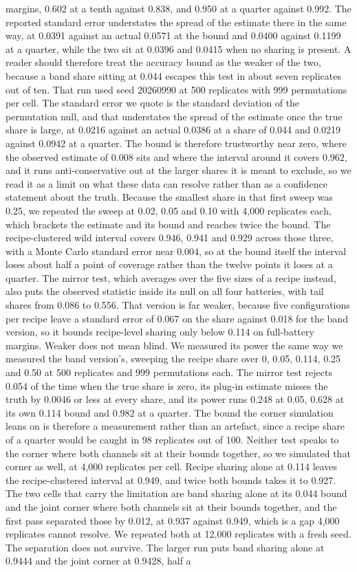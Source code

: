 margins, 0.602 at a tenth against 0.838, and 0.950 at a quarter against 0.992. The reported standard error understates the spread of the estimate there in the same way, at 0.0391 against an actual 0.0571 at the bound and 0.0400 against 0.1199 at a quarter, while the two sit at 0.0396 and 0.0415 when no sharing is present. A reader should therefore treat the accuracy bound as the weaker of the two, because a band share sitting at 0.044 escapes this test in about seven replicates out of ten. That run used seed 20260990 at 500 replicates with 999 permutations per cell. The standard error we quote is the standard deviation of the permutation null, and that understates the spread of the estimate once the true share is large, at 0.0216 against an actual 0.0386 at a share of 0.044 and 0.0219 against 0.0942 at a quarter. The bound is therefore trustworthy near zero, where the observed estimate of 0.008 sits and where the interval around it covers 0.962, and it runs anti-conservative out at the larger shares it is meant to exclude, so we read it as a limit on what these data can resolve rather than as a confidence statement about the truth. Because the smallest share in that first sweep was 0.25, we repeated the sweep at 0.02, 0.05 and 0.10 with 4,000 replicates each, which brackets the estimate and its bound and reaches twice the bound. The recipe-clustered wild interval covers 0.946, 0.941 and 0.929 across those three, with a Monte Carlo standard error near 0.004, so at the bound itself the interval loses about half a point of coverage rather than the twelve points it loses at a quarter. The mirror test, which averages over the five sizes of a recipe instead, also puts the observed statistic inside its null on all four batteries, with tail shares from 0.086 to 0.556. That version is far weaker, because five configurations per recipe leave a standard error of 0.067 on the share against 0.018 for the band version, so it bounds recipe-level sharing only below 0.114 on full-battery margins. Weaker does not mean blind. We measured its power the same way we measured the band version's, sweeping the recipe share over 0, 0.05, 0.114, 0.25 and 0.50 at 500 replicates and 999 permutations each. The mirror test rejects 0.054 of the time when the true share is zero, its plug-in estimate misses the truth by 0.0046 or less at every share, and its power runs 0.248 at 0.05, 0.628 at its own 0.114 bound and 0.982 at a quarter. The bound the corner simulation leans on is therefore a measurement rather than an artefact, since a recipe share of a quarter would be caught in 98 replicates out of 100. Neither test speaks to the corner where both channels sit at their bounds together, so we simulated that corner as well, at 4,000 replicates per cell. Recipe sharing alone at 0.114 leaves the recipe-clustered interval at 0.949, and twice both bounds takes it to 0.927. The two cells that carry the limitation are band sharing alone at its 0.044 bound and the joint corner where both channels sit at their bounds together, and the first pass separated those by 0.012, at 0.937 against 0.949, which is a gap 4,000 replicates cannot resolve. We repeated both at 12,000 replicates with a fresh seed. The separation does not survive. The larger run puts band sharing alone at 0.9444 and the joint corner at 0.9428, half a 